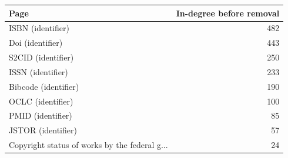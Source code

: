 
\begin{tabular}{lr}
\toprule
Page & In-degree before removal\\
\midrule
ISBN (identifier) & 482\\
Doi (identifier) & 443\\
S2CID (identifier) & 250\\
ISSN (identifier) & 233\\
Bibcode (identifier) & 190\\
OCLC (identifier) & 100\\
PMID (identifier) & 85\\
JSTOR (identifier) & 57\\
Copyright status of works by the federal g... & 24\\
\bottomrule
\end{tabular}
